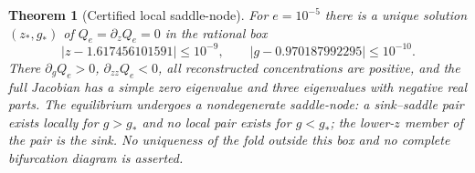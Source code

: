 \documentclass[11pt,a4paper]{article}
\theoremstyle{plain}
\newtheorem{theorem}{Theorem}[section]
\theoremstyle{definition}
\theoremstyle{remark}
\begin{document}
\begin{theorem}[Certified local saddle-node]\label{thm:fold}
For $e=10^{-5}$ there is a unique solution $(z_*,g_*)$ of $Q_e=\partial_zQ_e=0$ in the rational box
\begin{equation}\label{eq:foldbox}
|z-1.617456101591|\le10^{-9},\qquad|g-0.970187992295|\le10^{-10}.
\end{equation}
There $\partial_gQ_e>0$, $\partial_{zz}Q_e<0$, all reconstructed concentrations are positive, and the full Jacobian has a simple zero eigenvalue and three eigenvalues with negative real parts. The equilibrium undergoes a nondegenerate saddle-node: a sink--saddle pair exists locally for $g>g_*$ and no local pair exists for $g<g_*$; the lower-$z$ member of the pair is the sink. No uniqueness of the fold outside this box and no complete bifurcation diagram is asserted.
\end{theorem}
\end{document}
